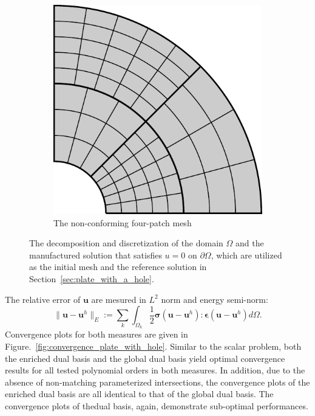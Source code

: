 \begin{figure}[ht]
\begin{subfigure}[t]{.3\textwidth}
		\includegraphics[scale=.45]{annular_mesh}
		\caption{The non-conforming four-patch mesh}
	\end{subfigure}
	\caption{The decomposition and discretization of the domain $\Omega$ and the manufactured solution that satisfies $u=0$ on $\partial\Omega$, which are utilized as the initial mesh and the reference solution in Section~\ref{sec:plate_with_a_hole}.}\label{fig:plate_with_hole_setup}
\end{figure}

The relative error of $\mathbf{u}$ are mesured in $L^2$ norm and energy semi-norm:
\begin{equation}
	\|\mathbf{u}-\mathbf{u}^h\|_{E}:=\sum_k\int_{\Omega_k}\frac{1}{2}\mathbf{\sigma}(\mathbf{u}-\mathbf{u}^h) \colon \mathbf{\epsilon}(\mathbf{u}-\mathbf{u}^h) d \Omega.
\end{equation}
Convergence plots for both measures are given in Figure.~\ref{fig:convergence_plate_with_hole}. Similar to the scalar problem, both the enriched dual basis and the global dual basis yield optimal convergence results for all tested polynomial orders in both measures. In addition, due to the absence of non-matching parameterized intersections, the convergence plots of the enriched dual basis are all identical to that of the global dual basis. The
convergence plots of the\Bezier dual basis, again, demonstrate sub-optimal performances.\par

